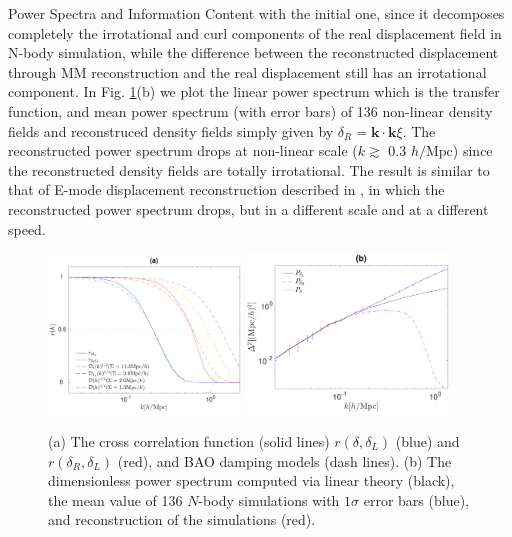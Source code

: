 \begin{section}{Power Spectra and Information Content}
with the initial one, since it decomposes completely the irrotational and curl components of the real displacement 
field in N-body simulation, while the difference between the reconstructed displacement through MM reconstruction 
and the real displacement still has an irrotational component.
 In Fig. \ref{fig:cross-correlation-power}(b) we plot the linear power spectrum which is the transfer function, and mean 
power spectrum (with error bars) of 136 non-linear density fields and reconstruced density fields simply 
given by $\delta_R=\bm{k}\cdot\bm{k}\xi$. The reconstructed power spectrum drops at non-linear scale ($k \gtrsim$ 0.3 $h/\mathrm{Mpc}$) 
since the reconstructed density fields are totally irrotational. The result is similar to that of 
E-mode displacement reconstruction described in \cite{bib:Yu2016}, in which the reconstructed power spectrum 
drops, but in a different scale and at a different speed.
\begin{figure}
\centering
\includegraphics[width=0.455\textwidth]{cross_correlation_best_analysis-crop.pdf} 
\includegraphics[width=0.48\textwidth]{power_best_analysis-crop.pdf}
\caption{(a) The cross correlation function (solid lines) $r(\delta,\delta_L)$ (blue) and $r(\delta_R,\delta_L)$ (red), 
and BAO damping models (dash lines). 
(b) The dimensionless power spectrum computed via linear theory (black), the mean value of 136 $N$-body simulations
with $1\sigma$ error bars (blue), and reconstruction of the simulations (red).}
\label{fig:cross-correlation-power}
\end{figure}


\end{section}
